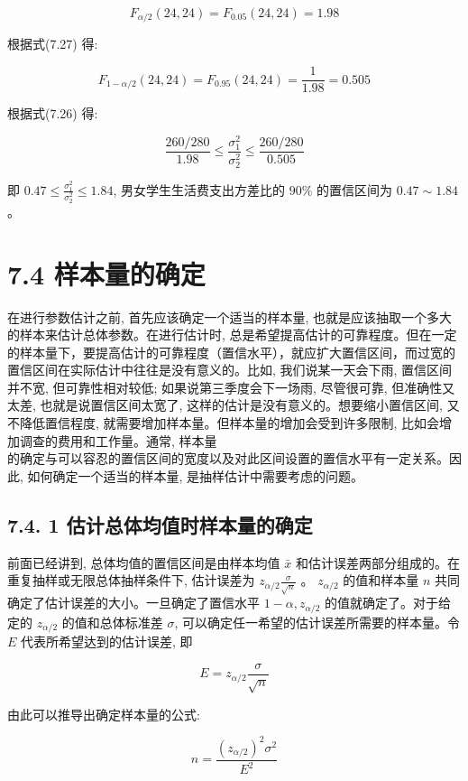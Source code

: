 \documentclass[10pt]{article}
\begin{document}
\begin{CJK*}{UTF8}{bsmi}
$$
F_{\alpha / 2}(24,24)=F_{0.05}(24,24)=1.98
$$

根据式(7.27) 得:

$$
F_{1-\alpha / 2}(24,24)=F_{0.95}(24,24)=\frac{1}{1.98}=0.505
$$

根据式(7.26) 得:

$$
\frac{260 / 280}{1.98} \leqslant \frac{\sigma_{1}^{2}}{\sigma_{2}^{2}} \leqslant \frac{260 / 280}{0.505}
$$

即 $0.47 \leqslant \frac{\sigma_{1}^{2}}{\sigma_{2}^{2}} \leqslant 1.84$, 男女学生生活费支出方差比的 $90 \%$ 的置信区间为 $0.47 \sim 1.84$ 。

\section*{7.4 样本量的确定}
在进行参数估计之前, 首先应该确定一个适当的样本量, 也就是应该抽取一个多大的样本来估计总体参数。在进行估计时, 总是希望提高估计的可靠程度。但在一定的样本量下，要提高估计的可靠程度（置信水平），就应扩大置信区间，而过宽的置信区间在实际估计中往往是没有意义的。比如, 我们说某一天会下雨, 置信区间并不宽, 但可靠性相对较低; 如果说第三季度会下一场雨, 尽管很可靠, 但准确性又太差, 也就是说置信区间太宽了, 这样的估计是没有意义的。想要缩小置信区间, 又不降低置信程度, 就需要增加样本量。但样本量的增加会受到许多限制, 比如会增加调查的费用和工作量。通常, 样本量\\
的确定与可以容忍的置信区间的宽度以及对此区间设置的置信水平有一定关系。因此, 如何确定一个适当的样本量, 是抽样估计中需要考虑的问题。

\subsection*{7.4. 1 估计总体均值时样本量的确定}
前面已经讲到, 总体均值的置信区间是由样本均值 $\bar{x}$ 和估计误差两部分组成的。在重复抽样或无限总体抽样条件下, 估计误差为 $z_{\alpha / 2} \frac{\sigma}{\sqrt{n}}$ 。 $z_{\alpha / 2}$ 的值和样本量 $n$ 共同确定了估计误差的大小。一旦确定了置信水平 $1-\alpha, z_{\alpha / 2}$ 的值就确定了。对于给定的 $z_{\alpha / 2}$ 的值和总体标准差 $\sigma$, 可以确定任一希望的估计误差所需要的样本量。令 $E$ 代表所希望达到的估计误差, 即


\begin{equation*}
E=z_{\alpha / 2} \frac{\sigma}{\sqrt{n}} \tag{7.28}
\end{equation*}


由此可以推导出确定样本量的公式:


\begin{equation*}
n=\frac{\left(z_{\alpha / 2}\right)^{2} \sigma^{2}}{E^{2}} \tag{7.29}
\end{equation*}



\end{CJK*}
\end{document}
